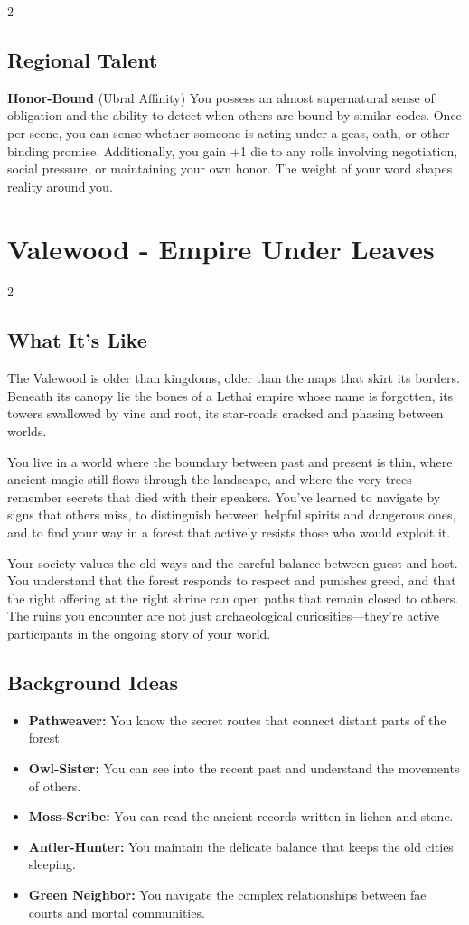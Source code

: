\documentclass[11pt]{article}
\newcommand{\region}[1]{\section*{#1}}
\newcommand{\subregion}[1]{\subsection*{#1}}
\begin{document}
\begin{multicols}{2}
\subregion{Regional Talent}

\textbf{Honor-Bound} (Ubral Affinity)
You possess an almost supernatural sense of obligation and the ability to detect when others are bound by similar codes. Once per scene, you can sense whether someone is acting under a geas, oath, or other binding promise. Additionally, you gain +1 die to any rolls involving negotiation, social pressure, or maintaining your own honor. The weight of your word shapes reality around you.

\end{multicols}

\region{Valewood - Empire Under Leaves}

\begin{multicols}{2}
\subregion{What It's Like}

The Valewood is older than kingdoms, older than the maps that skirt its borders. Beneath its canopy lie the bones of a Lethai empire whose name is forgotten, its towers swallowed by vine and root, its star-roads cracked and phasing between worlds.

You live in a world where the boundary between past and present is thin, where ancient magic still flows through the landscape, and where the very trees remember secrets that died with their speakers. You've learned to navigate by signs that others miss, to distinguish between helpful spirits and dangerous ones, and to find your way in a forest that actively resists those who would exploit it.

Your society values the old ways and the careful balance between guest and host. You understand that the forest responds to respect and punishes greed, and that the right offering at the right shrine can open paths that remain closed to others. The ruins you encounter are not just archaeological curiosities---they're active participants in the ongoing story of your world.

\columnbreak

\subregion{Background Ideas}

\begin{itemize}[leftmargin=*]
    \item \textbf{Pathweaver:} You know the secret routes that connect distant parts of the forest.
    \item \textbf{Owl-Sister:} You can see into the recent past and understand the movements of others.
    \item \textbf{Moss-Scribe:} You can read the ancient records written in lichen and stone.
    \item \textbf{Antler-Hunter:} You maintain the delicate balance that keeps the old cities sleeping.
    \item \textbf{Green Neighbor:} You navigate the complex relationships between fae courts and mortal communities.
\end{itemize}


\end{multicols}
\end{document}
